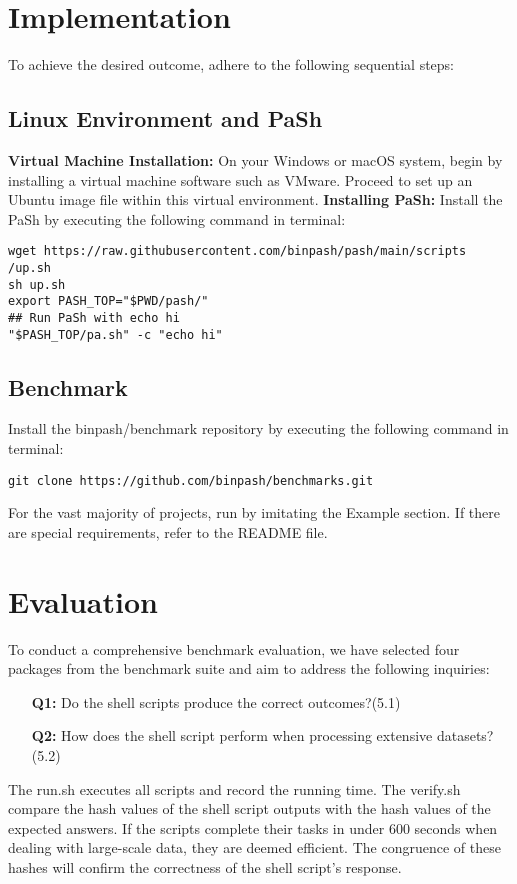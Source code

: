 \documentclass[sigplan, screen, 10pt]{acmart}
\begin{document}
\section{Implementation}
\label{tec}
To achieve the desired outcome, adhere to the following sequential steps:
\subsection{Linux Environment and PaSh}
\textbf{Virtual Machine Installation:} On your Windows or macOS system, begin by installing a virtual machine software such as VMware. Proceed to set up an Ubuntu image file within this virtual environment.\newline
\textbf{Installing PaSh:} Install the PaSh by executing the following command in terminal\cite{vasilakis2021pash}:
\begin{verbatim}
wget https://raw.githubusercontent.com/binpash/pash/main/scripts
/up.sh
sh up.sh
export PASH_TOP="$PWD/pash/"
## Run PaSh with echo hi
"$PASH_TOP/pa.sh" -c "echo hi"
\end{verbatim}
\subsection{Benchmark}
Install the binpash/benchmark repository by executing the following command in terminal:
\begin{verbatim}
git clone https://github.com/binpash/benchmarks.git
\end{verbatim}
For the vast majority of projects, run by imitating the Example section.
If there are special requirements, refer to the README file.


\section{Evaluation}
\label{eval}
To conduct a comprehensive benchmark evaluation, we have selected four packages from the benchmark suite and aim to address the following inquiries:
\begin{itemize}
\item[\textbf{Q1:}] Do the shell scripts produce the correct outcomes?(5.1)
\item[\textbf{Q2:}] How does the shell script perform when processing extensive datasets?(5.2)
\end{itemize}
The run.sh executes all scripts and record the running time.
The verify.sh compare the hash values of the shell script outputs with the hash values of the expected answers.
If the scripts complete their tasks in under 600 seconds when dealing with large-scale data, they are deemed efficient.
The congruence of these hashes will confirm the correctness of the shell script's response.
\end{document}
